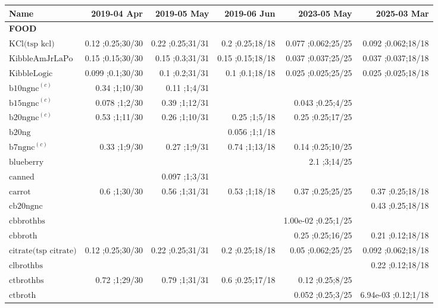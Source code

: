 \newcommand{\mjmdatemin}{2019-04-01}
\newcommand{\mjmdatemax}{2025-03-31}
\newcommand{\mjmsuperscripts}{{\bf a) } SMVT substrate. Biotin, Pantothenate, Lipoic Acid, and Iodine known to compete..{\bf c) } hamburger with varying fat percentages- 7,10,15,20, etc. ..}
\begin{table}[H]
\centering
\begin{tabular}{|l|r|r|r|r|r|}
\hline
Name&2019-04 Apr&2019-05 May&2019-06 Jun&2023-05 May&2025-03 Mar\\
\hline
{\bf FOOD}&&&&&\\
$\textrm{KCl(tsp~kcl)}$&0.12 ;0.25;30/30&0.22 ;0.25;31/31&0.2 ;0.25;18/18&0.077 ;0.062;25/25&0.092 ;0.062;18/18\\
$\textrm{KibbleAmJrLaPo}$&0.15 ;0.15;30/30&0.15 ;0.3;31/31&0.15 ;0.15;18/18&0.037 ;0.037;25/25&0.037 ;0.037;18/18\\
$\textrm{KibbleLogic}$&0.099 ;0.1;30/30&0.1 ;0.2;31/31&0.1 ;0.1;18/18&0.025 ;0.025;25/25&0.025 ;0.025;18/18\\
$\textrm{b10ngnc}^{\left(c\right)}$&0.34 ;1;10/30&0.11 ;1;4/31&&&\\
$\textrm{b15ngnc}^{\left(c\right)}$&0.078 ;1;2/30&0.39 ;1;12/31&&0.043 ;0.25;4/25&\\
$\textrm{b20ngnc}^{\left(c\right)}$&0.53 ;1;11/30&0.26 ;1;10/31&0.25 ;1;5/18&0.25 ;0.25;17/25&\\
$\textrm{b20ng}$&&&0.056 ;1;1/18&&\\
$\textrm{b7ngnc}^{\left(c\right)}$&0.33 ;1;9/30&0.27 ;1;9/31&0.74 ;1;13/18&0.14 ;0.25;10/25&\\
$\textrm{blueberry}$&&&&2.1 ;3;14/25&\\
$\textrm{canned}$&&0.097 ;1;3/31&&&\\
$\textrm{carrot}$&0.6 ;1;30/30&0.56 ;1;31/31&0.53 ;1;18/18&0.37 ;0.25;25/25&0.37 ;0.25;18/18\\
$\textrm{cb20ngnc}$&&&&&0.43 ;0.25;18/18\\
$\textrm{cbbrothbs}$&&&&1.00e-02 ;0.25;1/25&\\
$\textrm{cbbroth}$&&&&0.25 ;0.25;16/25&0.21 ;0.12;18/18\\
$\textrm{citrate(tsp~citrate)}$&0.12 ;0.25;30/30&0.22 ;0.25;31/31&0.2 ;0.25;18/18&0.05 ;0.062;25/25&0.092 ;0.062;18/18\\
$\textrm{clbrothbs}$&&&&&0.22 ;0.12;18/18\\
$\textrm{ctbrothbs}$&0.72 ;1;29/30&0.79 ;1;31/31&0.6 ;0.25;17/18&0.12 ;0.25;8/25&\\
$\textrm{ctbroth}$&&&&0.052 ;0.25;3/25&6.94e-03 ;0.12;1/18\\

\end{tabular}
\end{table}
